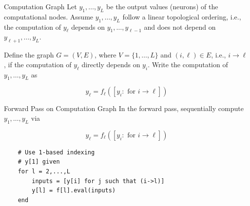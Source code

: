 \begin{frame}[allowframebreaks]

\begin{mydefinitionblock}{6.40}{Computation Graph}
    Let $y_{1}, \ldots, y_{L}$ be the output values (neurons) of the computational nodes. Assume $y_{1}, \ldots, y_{L}$ follow a linear topological ordering, i.e., the computation of $y_{\ell}$ depends on $y_{1}, \ldots, y_{\ell-1}$ and does not depend on $y_{\ell+1}, \ldots, y_{L}$.

    Define the graph $G=(V, E)$, where $V=\{1, \ldots, L\}$ and $(i, \ell) \in E$, i.e., $i \rightarrow \ell$, if the computation of $y_{\ell}$ directly depends on $y_{i}$. Write the computation of $y_{1}, \ldots, y_{L}$ as

    $$
    y_{\ell}=f_{\ell}\left(\left[y_{i}: \text { for } i \rightarrow \ell\right]\right)
    $$
\end{mydefinitionblock}

\end{frame}

\begin{frame}[allowframebreaks]

\begin{mydefinitionblock}{6.41}{Forward Pass on Computation Graph}
    In the forward pass, sequentially compute $y_{1}, \ldots, y_{L}$ via

    $$
    y_{\ell}=f_{\ell}\left(\left[y_{i}: \text { for } i \rightarrow \ell\right]\right)
    $$

    \begin{verbatim}
    # Use 1-based indexing
    # y[1] given
    for l = 2,...,L
        inputs = [y[i] for j such that (i->l)]
        y[l] = f[l].eval(inputs)
    end
    \end{verbatim}
\end{mydefinitionblock}

\end{frame}

